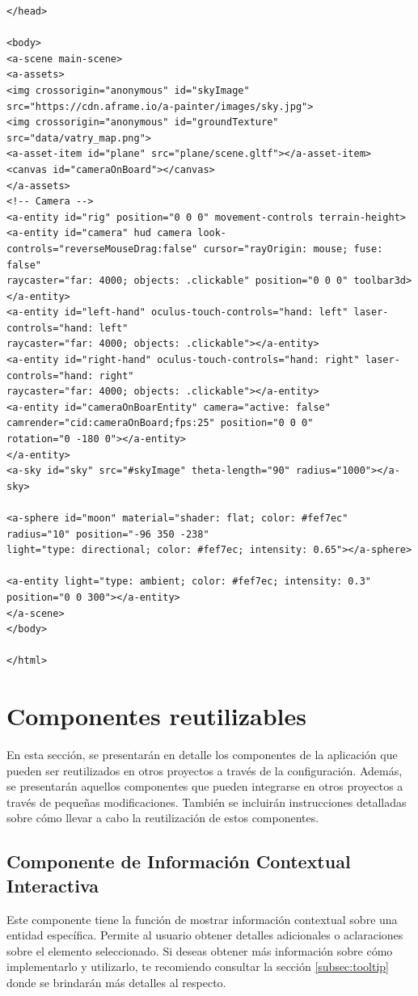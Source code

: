 \documentclass[a4paper, 11pt]{book}
\begin{document}
\begin{verbatim}
</head>

<body>
<a-scene main-scene>
<a-assets>
<img crossorigin="anonymous" id="skyImage" src="https://cdn.aframe.io/a-painter/images/sky.jpg">
<img crossorigin="anonymous" id="groundTexture" src="data/vatry_map.png">
<a-asset-item id="plane" src="plane/scene.gltf"></a-asset-item>
<canvas id="cameraOnBoard"></canvas>
</a-assets>
<!-- Camera -->
<a-entity id="rig" position="0 0 0" movement-controls terrain-height>
<a-entity id="camera" hud camera look-controls="reverseMouseDrag:false" cursor="rayOrigin: mouse; fuse: false"
raycaster="far: 4000; objects: .clickable" position="0 0 0" toolbar3d>
</a-entity>
<a-entity id="left-hand" oculus-touch-controls="hand: left" laser-controls="hand: left"
raycaster="far: 4000; objects: .clickable"></a-entity>
<a-entity id="right-hand" oculus-touch-controls="hand: right" laser-controls="hand: right"
raycaster="far: 4000; objects: .clickable"></a-entity>
<a-entity id="cameraOnBoarEntity" camera="active: false" camrender="cid:cameraOnBoard;fps:25" position="0 0 0"
rotation="0 -180 0"></a-entity>
</a-entity>
<a-sky id="sky" src="#skyImage" theta-length="90" radius="1000"></a-sky>

<a-sphere id="moon" material="shader: flat; color: #fef7ec" radius="10" position="-96 350 -238"
light="type: directional; color: #fef7ec; intensity: 0.65"></a-sphere>

<a-entity light="type: ambient; color: #fef7ec; intensity: 0.3" position="0 0 300"></a-entity>
</a-scene>
</body>

</html>
\end{verbatim}

\section{Componentes reutilizables}
\label{sec:componentesreutilizables}
En esta sección, se presentarán en detalle los componentes de la aplicación que pueden ser reutilizados en otros proyectos a través de la configuración. Además, se presentarán aquellos componentes que pueden integrarse en otros proyectos a través de pequeñas modificaciones. También se incluirán instrucciones detalladas sobre cómo llevar a cabo la reutilización de estos componentes.
\subsection{Componente de Información Contextual Interactiva}
Este componente tiene la función de mostrar información contextual sobre una entidad específica. Permite al usuario obtener detalles adicionales o aclaraciones sobre el elemento seleccionado. Si deseas obtener más información sobre cómo implementarlo y utilizarlo, te recomiendo consultar la sección \ref{subsec:tooltip} donde se brindarán más detalles al respecto.
\end{document}
